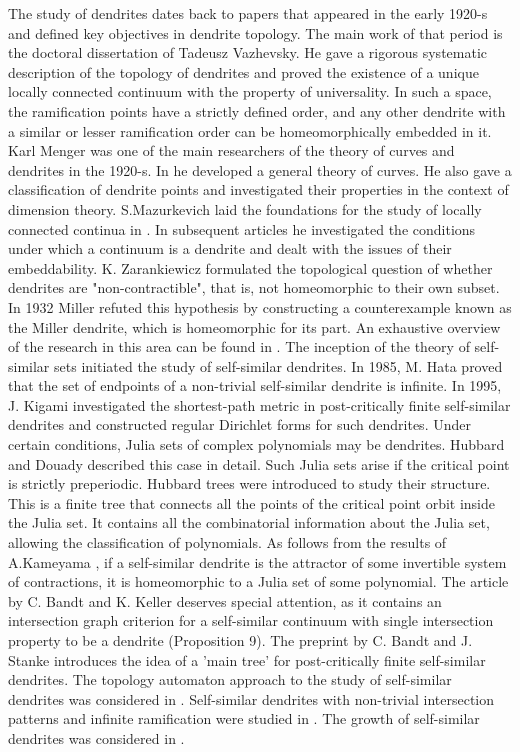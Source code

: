 \documentclass[11pt,reqno]{amsart}
\begin{document}
The study of dendrites dates back to papers \cite{Maz, Men, Mil, W} that appeared in the early 1920-s and defined key objectives in dendrite topology. The main work of that period is the doctoral dissertation \cite{W} of Tadeusz Vazhevsky. He gave a rigorous systematic description of the topology of dendrites and proved the existence of a unique locally connected continuum with the property of universality. In such a space, the ramification points have a strictly defined order, and any other dendrite with a similar or lesser ramification order can be homeomorphically embedded in it. Karl Menger was one of the main researchers of the theory of curves and dendrites in the 1920-s. In \cite{Men} he developed a general theory of curves. He also gave a classification of dendrite points and investigated their properties in the context of dimension theory. S.Mazurkevich laid the foundations for the study of locally connected continua in \cite{Maz}. In subsequent articles  he investigated the conditions under which a continuum is a dendrite and dealt with the issues of their embeddability. K. Zarankiewicz formulated the topological question of whether dendrites are "non-contractible", that is, not homeomorphic to their own subset. In 1932 \cite{Mil}  Miller refuted this hypothesis by constructing a counterexample known as the Miller dendrite, which is homeomorphic for its part.
An exhaustive overview of the research in this area  can be found in \cite{Char}. 
The inception of the theory of self-similar sets \cite{Hut} initiated the study of self-similar dendrites. In  1985, M. Hata  \cite{Hata85} proved that the set of endpoints of a non-trivial self-similar dendrite is infinite. In 1995, J. Kigami \cite{Kig,Kig95} investigated the shortest-path metric in post-critically finite self-similar dendrites and constructed regular Dirichlet forms for such dendrites. Under certain conditions, Julia sets of complex polynomials may be dendrites. 
Hubbard and Douady \cite{DH1984} described this case in detail. Such Julia sets arise if the critical point is strictly preperiodic. Hubbard trees were introduced to study their structure. This is a finite tree that connects all the points of the critical point orbit inside the Julia set. It contains all the combinatorial information about the Julia set, allowing the classification of polynomials.
As  follows from the results of A.Kameyama \cite{Kam}, if a self-similar dendrite is the attractor of some invertible system of contractions, it is homeomorphic to a Julia set of some polynomial.
 The article \cite{SSS2} by C. Bandt and K. Keller deserves special attention, as it contains an intersection graph criterion for a  self-similar continuum with single intersection property to be a dendrite (Proposition 9). The preprint \cite{SSS6} by C. Bandt and J. Stanke introduces the idea of a 'main tree' for post-critically finite self-similar dendrites.
The topology automaton approach to the study of self-similar dendrites was considered in \cite{Bandt2024, RZ2020, RWYZ2023}.
Self-similar dendrites with non-trivial intersection patterns and infinite ramification were studied in \cite{AST2024, AK2025}.
The growth of self-similar dendrites was considered in \cite{barua2022}.
\end{document}
